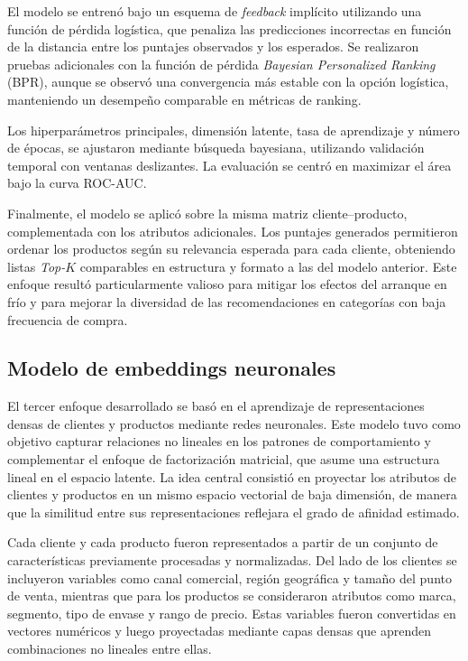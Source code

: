 El modelo se entrenó bajo un esquema de \textit{feedback} implícito utilizando una función de pérdida logística, que penaliza las predicciones incorrectas en función de la distancia entre los puntajes observados y los esperados. Se realizaron pruebas adicionales con la función de pérdida \textit{Bayesian Personalized Ranking} (BPR), aunque se observó una convergencia más estable con la opción logística, manteniendo un desempeño comparable en métricas de ranking.

Los hiperparámetros principales, dimensión latente, tasa de aprendizaje y número de épocas, se ajustaron mediante búsqueda bayesiana, utilizando validación temporal con ventanas deslizantes. La evaluación se centró en maximizar el área bajo la curva ROC-AUC.

Finalmente, el modelo se aplicó sobre la misma matriz cliente–producto, complementada con los atributos adicionales. Los puntajes generados permitieron ordenar los productos según su relevancia esperada para cada cliente, obteniendo listas \textit{Top-$K$} comparables en estructura y formato a las del modelo anterior. Este enfoque resultó particularmente valioso para mitigar los efectos del arranque en frío y para mejorar la diversidad de las recomendaciones en categorías con baja frecuencia de compra.

\subsection{Modelo de embeddings neuronales}

El tercer enfoque desarrollado se basó en el aprendizaje de representaciones densas de clientes y productos mediante redes neuronales. Este modelo tuvo como objetivo capturar relaciones no lineales en los patrones de comportamiento y complementar el enfoque de factorización matricial, que asume una estructura lineal en el espacio latente. La idea central consistió en proyectar los atributos de clientes y productos en un mismo espacio vectorial de baja dimensión, de manera que la similitud entre sus representaciones reflejara el grado de afinidad estimado.

Cada cliente y cada producto fueron representados a partir de un conjunto de características previamente procesadas y normalizadas. Del lado de los clientes se incluyeron variables como canal comercial, región geográfica y tamaño del punto de venta, mientras que para los productos se consideraron atributos como marca, segmento, tipo de envase y rango de precio. Estas variables fueron convertidas en vectores numéricos y luego proyectadas mediante capas densas que aprenden combinaciones no lineales entre ellas. 

